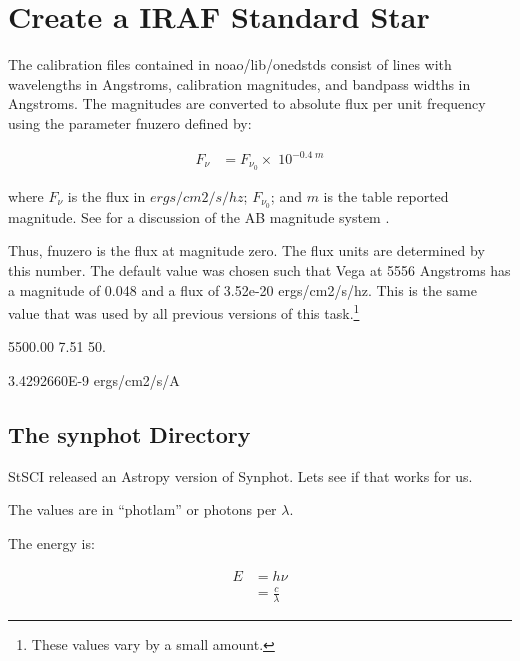\renewcommand{\footerfilename}{SpectroStandards.tex}

\section{Create a IRAF Standard Star}

The calibration files contained in noao/lib/onedstds consist of lines
with wavelengths in Angstroms, calibration magnitudes, and bandpass
widths in Angstroms. The magnitudes are converted to absolute flux per
unit frequency using the parameter fnuzero defined by:

\begin{subequations}
\begin{align}
F_{\nu} &= F_{\nu_{0}} \times\; 10^{-0.4\; m}
\end{align}
\end{subequations}

where $F_{\nu}$ is the flux in $ergs/cm2/s/hz$; $F_{\nu_{0}}$; and $m$
is the table reported magnitude. See \cite{1983ApJ...266..713O} for a
discussion of the AB magnitude system .

Thus, fnuzero is the flux at magnitude zero. The flux units are
determined by this number. The default value was chosen such that Vega
at 5556 Angstroms has a magnitude of 0.048 and a flux of 3.52e-20
ergs/cm2/s/hz. This is the same value that was used by all previous
versions of this task.\footnote{These values vary by a small amount.}

5500.00    7.51  50.

3.4292660E-9  ergs/cm2/s/A


\subsection{The synphot Directory}

StSCI released an Astropy version of Synphot. Lets see if that works
for us.


The values are in ``photlam'' or photons per $\lambda$. 

The energy is:

\begin{subequations}
\begin{align}
E &= h\nu \\
  &= \frac{c}{\lambda}
\end{align}
\end{subequations}

